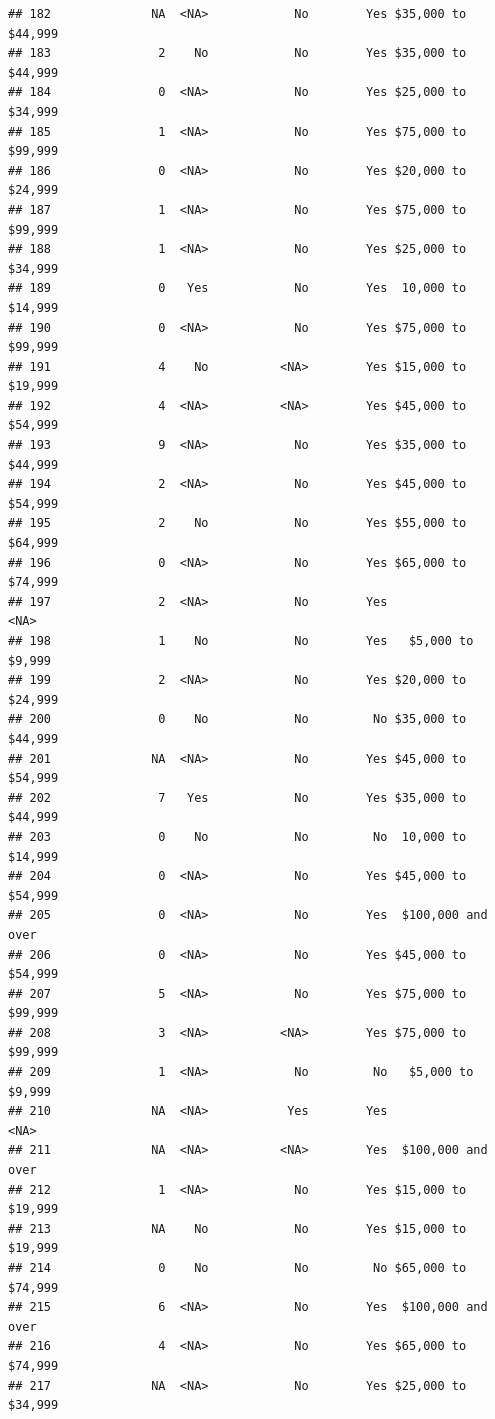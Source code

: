 \documentclass[man]{apa6}
\begin{document}
\begin{verbatim}
## 182              NA  <NA>            No        Yes $35,000 to $44,999
## 183               2    No            No        Yes $35,000 to $44,999
## 184               0  <NA>            No        Yes $25,000 to $34,999
## 185               1  <NA>            No        Yes $75,000 to $99,999
## 186               0  <NA>            No        Yes $20,000 to $24,999
## 187               1  <NA>            No        Yes $75,000 to $99,999
## 188               1  <NA>            No        Yes $25,000 to $34,999
## 189               0   Yes            No        Yes  10,000 to $14,999
## 190               0  <NA>            No        Yes $75,000 to $99,999
## 191               4    No          <NA>        Yes $15,000 to $19,999
## 192               4  <NA>          <NA>        Yes $45,000 to $54,999
## 193               9  <NA>            No        Yes $35,000 to $44,999
## 194               2  <NA>            No        Yes $45,000 to $54,999
## 195               2    No            No        Yes $55,000 to $64,999
## 196               0  <NA>            No        Yes $65,000 to $74,999
## 197               2  <NA>            No        Yes               <NA>
## 198               1    No            No        Yes   $5,000 to $9,999
## 199               2  <NA>            No        Yes $20,000 to $24,999
## 200               0    No            No         No $35,000 to $44,999
## 201              NA  <NA>            No        Yes $45,000 to $54,999
## 202               7   Yes            No        Yes $35,000 to $44,999
## 203               0    No            No         No  10,000 to $14,999
## 204               0  <NA>            No        Yes $45,000 to $54,999
## 205               0  <NA>            No        Yes  $100,000 and over
## 206               0  <NA>            No        Yes $45,000 to $54,999
## 207               5  <NA>            No        Yes $75,000 to $99,999
## 208               3  <NA>          <NA>        Yes $75,000 to $99,999
## 209               1  <NA>            No         No   $5,000 to $9,999
## 210              NA  <NA>           Yes        Yes               <NA>
## 211              NA  <NA>          <NA>        Yes  $100,000 and over
## 212               1  <NA>            No        Yes $15,000 to $19,999
## 213              NA    No            No        Yes $15,000 to $19,999
## 214               0    No            No         No $65,000 to $74,999
## 215               6  <NA>            No        Yes  $100,000 and over
## 216               4  <NA>            No        Yes $65,000 to $74,999
## 217              NA  <NA>            No        Yes $25,000 to $34,999

\end{verbatim}
\end{document}
